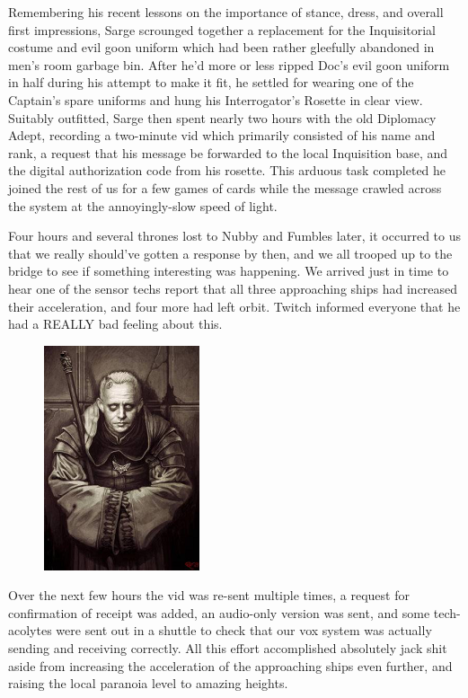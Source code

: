 Remembering his recent lessons on the importance of stance, dress, and overall first impressions, Sarge scrounged together a replacement for the Inquisitorial costume and evil goon uniform which had been rather gleefully abandoned in men's room garbage bin. 
After he'd more or less ripped Doc's evil goon uniform in half during his attempt to make it fit, he settled for wearing one of the Captain's spare uniforms and hung his Interrogator's Rosette in clear view. 
Suitably outfitted, Sarge then spent nearly two hours with the old Diplomacy Adept, recording a two-minute vid which primarily consisted of his name and rank, a request that his message be forwarded to the local Inquisition base, and the digital authorization code from his rosette. 
This arduous task completed he joined the rest of us for a few games of cards while the message crawled across the system at the annoyingly-slow speed of light.

Four hours and several thrones lost to Nubby and Fumbles later, it occurred to us that we really should've gotten a response by then, and we all trooped up to the bridge to see if something interesting was happening. 
We arrived just in time to hear one of the sensor techs report that all three approaching ships had increased their acceleration, and four more had left orbit. 
Twitch informed everyone that he had a REALLY bad feeling about this.

\begin{figure}
	\begin{center}
		\includegraphics[width=\figwidth]{pics/15/25.png}
	\end{center}
\end{figure}
Over the next few hours the vid was re-sent multiple times, a request for confirmation of receipt was added, an audio-only version was sent, and some tech-acolytes were sent out in a shuttle to check that our vox system was actually sending and receiving correctly. 
All this effort accomplished absolutely jack shit aside from increasing the acceleration of the approaching ships even further, and raising the local paranoia level to amazing heights.

